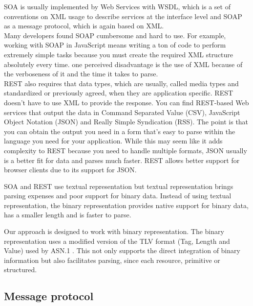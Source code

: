 SOA is usually implemented by Web Services with WSDL, which is a set of conventions on XML usage to describe
services at the interface level and SOAP as a message protocol, which is again based on XML.\\

Many developers found SOAP cumbersome and hard to use. For example, working with SOAP in JavaScript means writing
a ton of code to perform extremely simple tasks because you must create the required XML structure absolutely
every time. one perceived disadvantage is the use of XML because of the verboseness of it and the time it takes
to parse.\\


REST also requires that data types, which are usually, called media types and standardized or previously agreed,
when they are application specific.
REST doesn’t have to use XML to provide the response. You can find REST-based Web services that output
the data in Command Separated Value (CSV), JavaScript Object Notation (JSON) and Really Simple Syndication (RSS).
The point is that you can obtain the output you need in a form that’s easy to parse within the language you need
for your application. While this may seem like it adds complexity to REST because you need to handle multiple
formats, JSON usually is a better fit for data and parses much faster. REST allows better support for browser
clients due to its support for JSON.

SOA and REST use textual representation but textual representation brings parsing expenses and poor support
for binary data. Instead of using textual representation, the binary representation provides native support for
binary data, has a smaller length and is faster to parse.

Our approach is designed to work with binary representation. The binary representation uses a modified version
of the TLV format (Tag, Length and Value) used by ASN.1 \citep{asn1:opt}. This not only supports the direct integration of
binary information but also facilitates parsing, since each resource, primitive or structured.

\subsection{Message protocol}
\label{section:mprotocol}

